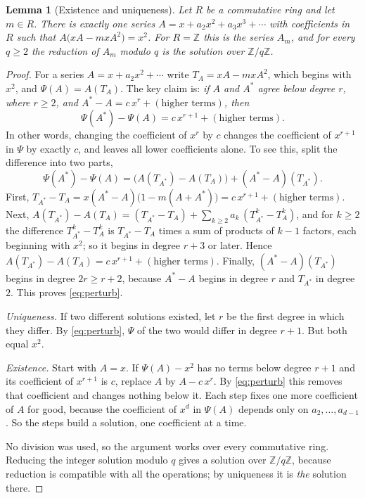 \documentclass[11pt,a4paper]{article}
\newtheorem{lemma}[theorem]{Lemma}
\theoremstyle{definition}
\theoremstyle{remark}
\newcommand{\Z}{\mathbb{Z}}
\begin{document}
\begin{lemma}[Existence and uniqueness]\label{lem:exist}
Let $R$ be a commutative ring and let $m\in R$. There is exactly one series $A=x+a_2x^2+a_3x^3+\cdots$ with coefficients
in $R$ such that $A\bigl(xA-mxA^2\bigr)=x^2$. For $R=\Z$ this is the series $A_m$, and for every $q\ge2$ the reduction of
$A_m$ modulo $q$ is the solution over $\Z/q\Z$.
\end{lemma}

\begin{proof}
For a series $A=x+a_2x^2+\cdots$ write $T_A=xA-mxA^2$, which begins with $x^2$, and $\Psi(A)=A(T_A)$. The key
claim is: \emph{if $A$ and $A^*$ agree below degree $r$, where $r\ge2$, and $A^*-A=c\,x^r+(\text{higher terms})$, then
\begin{equation}\label{eq:perturb}
\Psi(A^*)-\Psi(A)=c\,x^{r+1}+(\text{higher terms}).
\end{equation}}
In other words, changing the coefficient of $x^r$ by $c$ changes the coefficient of $x^{r+1}$ in $\Psi$ by exactly $c$, and
leaves all lower coefficients alone. To see this, split the difference into two parts,
\[
\Psi(A^*)-\Psi(A)=\bigl(A(T_{A^*})-A(T_A)\bigr)+(A^*-A)(T_{A^*}).
\]
First, $T_{A^*}-T_A=x(A^*-A)\bigl(1-m(A+A^*)\bigr)=c\,x^{r+1}+(\text{higher terms})$. Next,
$A(T_{A^*})-A(T_A)=(T_{A^*}-T_A)+\sum_{k\ge2}a_k\,(T_{A^*}^k-T_A^k)$, and for $k\ge2$ the difference
$T_{A^*}^k-T_A^k$ is $T_{A^*}-T_A$ times a sum of products of $k-1$ factors, each beginning with $x^2$; so it begins
in degree $r+3$ or later. Hence $A(T_{A^*})-A(T_A)=c\,x^{r+1}+(\text{higher terms})$. Finally,
$(A^*-A)(T_{A^*})$ begins in degree $2r\ge r+2$, because $A^*-A$ begins in degree $r$ and $T_{A^*}$ in degree $2$.
This proves \eqref{eq:perturb}.

\emph{Uniqueness.} If two different solutions existed, let $r$ be the first degree in which they differ. By
\eqref{eq:perturb}, $\Psi$ of the two would differ in degree $r+1$. But both equal $x^2$.

\emph{Existence.} Start with $A=x$. If $\Psi(A)-x^2$ has no terms below degree $r+1$ and its coefficient of $x^{r+1}$
is $c$, replace $A$ by $A-c\,x^r$. By \eqref{eq:perturb} this removes that coefficient and changes nothing below it.
Each step fixes one more coefficient of $A$ for good, because the coefficient of $x^d$ in $\Psi(A)$ depends only on
$a_2,\dots,a_{d-1}$. So the steps build a solution, one coefficient at a time.

No division was used, so the argument works over every commutative ring. Reducing the integer solution modulo $q$
gives a solution over $\Z/q\Z$, because reduction is compatible with all the operations; by uniqueness it is
\emph{the} solution there.
\end{proof}
\end{document}
